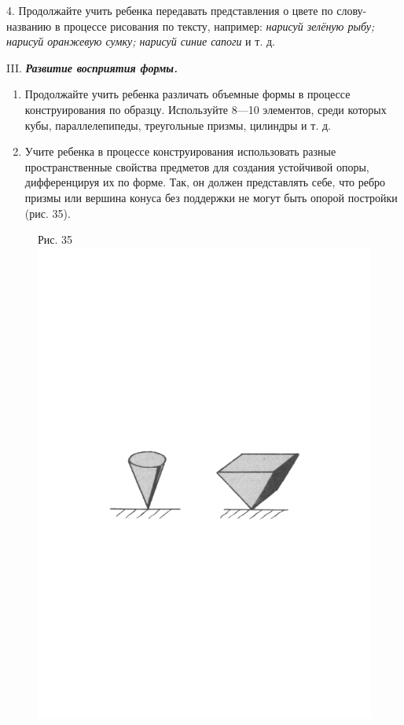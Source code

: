 \documentclass[a5paper]{book}
\renewcommand{\emph}[1]{\textit{#1}}
\begin{document}
4. Продолжайте учить ребенка передавать представления о цвете по
слову-названию в процессе рисования по тексту, например: \emph{нарисуй
зелёную рыбу; нарисуй оранжевую сумку; нарисуй синие сапоги} и т. д.

III. \emph{\textbf{Развитие восприятия формы.}}


\begin{enumerate}
\def\labelenumi{\arabic{enumi}.}
\item
  
  Продолжайте учить ребенка различать объемные формы в процессе
  конструирования по образцу. Используйте 8---10 элементов, среди
  которых кубы, параллелепипеды, треугольные призмы, цилиндры и т. д.
  
\item
  
  Учите ребенка в процессе конструирования использовать разные
  пространственные свойства предметов для создания устойчивой опоры,
  дифференцируя их по форме. Так, он должен представлять себе, что ребро
  призмы или вершина конуса без поддержки не могут быть опорой постройки
  (рис. 35).
  
\end{enumerate}


\begin{figure}
\centering
Рис. 35\includegraphics[width=\linewidth]{media/media/image32.png}
\end{figure}
\end{document}
